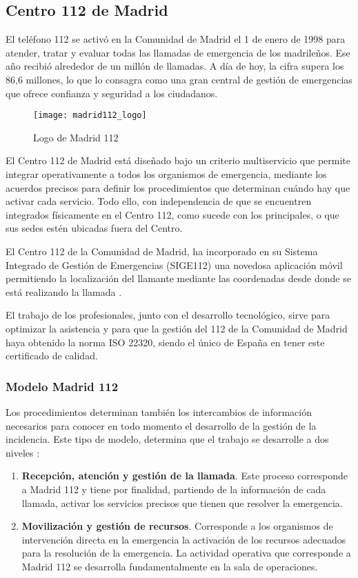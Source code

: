 \subsection{Centro 112 de Madrid}

El teléfono 112 se activó en la Comunidad de Madrid el 1 de enero de 1998 para atender, tratar y evaluar todas las llamadas de emergencia de los madrileños. Ese año recibió alrededor de un millón de llamadas. A día de hoy, la cifra supera los 86,6 millones, lo que lo consagra como una gran central de gestión de emergencias que ofrece confianza y seguridad a los ciudadanos.

\begin{figure}[htp!]
  \centering
  \texttt{[image: madrid112\_logo]}
  \caption{Logo de Madrid 112}
  \label{fig:madrid112_logo}
\end{figure}

El Centro 112 de Madrid está diseñado bajo un criterio multiservicio que permite integrar operativamente a todos los organismos de emergencia, mediante los acuerdos precisos para definir los procedimientos que determinan cuándo hay que activar cada servicio. Todo ello, con independencia de que se encuentren integrados físicamente en el Centro 112, como sucede con los principales, o que sus sedes estén ubicadas fuera del Centro.

El Centro 112 de la Comunidad de Madrid, ha incorporado en su Sistema Integrado de Gestión de Emergencias (SIGE112) una novedosa aplicación móvil permitiendo la localización del llamante mediante las coordenadas desde donde se está realizando la llamada \cite{madrid5}.

El trabajo de los profesionales, junto con el desarrollo tecnológico, sirve para optimizar la asistencia y para que la gestión del 112 de la Comunidad de Madrid haya obtenido la norma ISO 22320, siendo el único de España en tener este certificado de calidad.

\subsubsection{Modelo Madrid 112}

Los procedimientos determinan también los intercambios de información necesarios para conocer en todo momento el desarrollo de la gestión de la incidencia. Este tipo de modelo, determina que el trabajo se desarrolle a dos niveles \cite{madrid2}:

\begin{enumerate}
  \item \textbf{Recepción, atención y gestión de la llamada}. Este proceso corresponde a Madrid 112 y tiene por finalidad, partiendo de la información de cada llamada, activar los servicios precisos que tienen que resolver la emergencia.
  \item \textbf{Movilización y gestión de recursos}. Corresponde a los organismos de intervención directa en la emergencia la activación de los recursos adecuados para la resolución de la emergencia. La actividad operativa que corresponde a Madrid 112 se desarrolla fundamentalmente en la sala de operaciones.
\end{enumerate}

